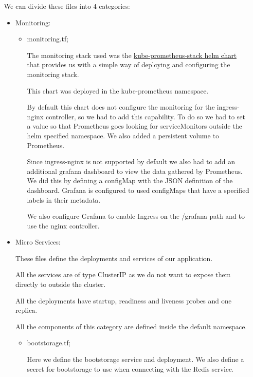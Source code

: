 \documentclass[12pt,a4paper,oneside]{report}
\begin{document}
We can divide these files into 4 categories:
\begin{itemize}
	\item Monitoring:
		\begin{itemize}
			\item monitoring.tf;
			
        		The monitoring stack used was the \href{https://github.com/prometheus-community/helm-charts/tree/main/charts/kube-prometheus-stack}{kube-prometheus-stack helm chart} that provides us with a simple way of deploying and configuring the monitoring stack. 
			
        		This chart was deployed in the kube-prometheus namespace. 
        		
        		By default this chart does not configure the monitoring for the ingress-nginx controller, so we had to add this capability. To do so we had to set a value so that Prometheus goes looking for serviceMonitors outside the helm specified namespace. We also added a persistent volume to Prometheus.
        		
        		Since ingress-nginx is not supported by default we also had to add an additional grafana dashboard to view the data gathered by Prometheus. We did this by defining a configMap  with the \ac{JSON} definition of the dashboard. Grafana is configured to used configMaps that have a specified labels in their metadata. 
        		
        		We also configure Grafana to enable Ingress on the /grafana path and to use the nginx controller.

		\end{itemize}
		
	\item Micro Services:
	
	    These files define the deployments and services of our application.
	    
	    All the services are of type ClusterIP as we do not want to expose them directly to outside the cluster.
	    
	    All the deployments have startup, readiness and liveness probes and one replica.
	    
	    All the components of this category are defined inside the default namespace.
	    
	
		\begin{itemize}
			\item bootstorage.tf;
			
			Here we define the bootstorage service and deployment. We also define a secret for bootstorage to use when connecting with the Redis service. 
			

\end{itemize}
\end{itemize}
\end{document}
